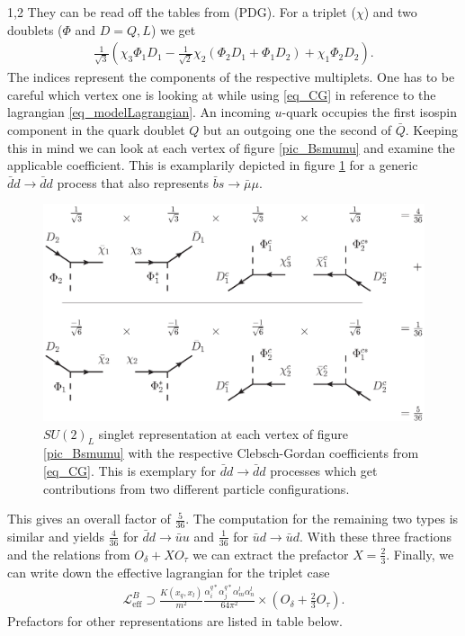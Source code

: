 \documentclass[11pt,a4paper,twoside]{article}
\numberwithin{equation}{section}
\begin{document}
\begin{spacing}{1,2}
They can be read off the tables from (PDG). For a triplet ($\chi$) and two doublets ($\Phi$ and $D=Q,L$) we get
\begin{align}
 \frac{1}{\sqrt{3}}\left(\chi_3\Phi_1D_1 - \frac{1}{\sqrt{2}}\chi_2\left(\Phi_2D_1+\Phi_1 D_2\right) + \chi_1\Phi_2D_2 \right).
 \label{eq_CG}
\end{align}
The indices represent the components of the respective multiplets. One has to be careful which vertex one is looking at while using \eqref{eq_CG} in reference
to the lagrangian \eqref{eq_modelLagrangian}. An incoming $u$-quark occupies the first isospin component in the quark doublet $Q$ but an outgoing one the 
second of $\bar Q$. Keeping this in mind we can look at each vertex of figure \ref{pic_Bsmumu} and examine the applicable coefficient. This is examplarily
depicted in figure \ref{pic_CG} for a generic $\bar d d\rightarrow \bar d d$ process that also represents $\bar b s \rightarrow \bar \mu \mu$.
\begin{figure}[t]
 \includegraphics[width=\textwidth]{../pics/CG.eps}
 \caption{$SU(2)_L$ singlet representation at each vertex of figure \ref{pic_Bsmumu} with the respective Clebsch-Gordan coefficients from \eqref{eq_CG}. 
 This is exemplary for $\bar d d\rightarrow \bar d d$ processes which get contributions from two different particle configurations.}
 \label{pic_CG}
\end{figure}
This gives an overall factor of $\frac{5}{36}$. The computation for the remaining two types is similar and yields $\frac{4}{36}$ for 
$\bar d d\rightarrow \bar u u$ and $\frac{1}{36}$ for $\bar u d \rightarrow \bar u d$. With these three fractions and the relations from $O_\delta + X O_\tau$
we can extract the prefactor $X=\frac23$. Finally, we can write down the effective lagrangian for the triplet case
\begin{align}
 \mathcal{L}^B_\text{eff} \supset \frac{K(x_q,x_l)}{m^2}\frac{\alpha_i^{q*} \alpha_j^{q*} \alpha_m^l \alpha_n^l}{64\pi^2}\times\left(O_\delta + \frac23 O_\tau\right).
 \label{eq_LagBSmumuModB}
\end{align}
Prefactors for other representations are listed in table below.


\end{spacing}
\end{document}
